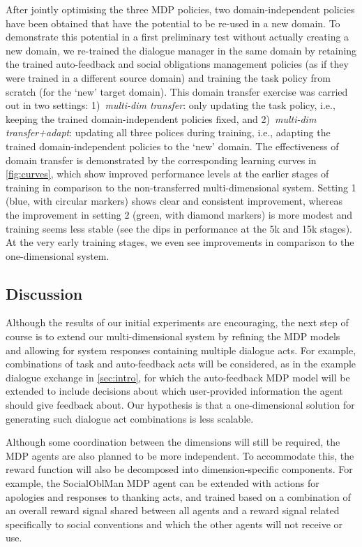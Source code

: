 \documentclass[11pt]{article}
\begin{document}
After jointly optimising the three MDP policies, two domain-independent policies have been obtained that have the potential to be re-used in a new domain.  To demonstrate this potential in a first preliminary test without actually creating a new domain, we re-trained the dialogue manager in the same domain by retaining the trained auto-feedback and social obligations management policies (as if they were trained in a different source domain) and training the task policy from scratch (for the `new' target domain).  This domain transfer exercise was carried out in two settings: 1)~\textsl{multi-dim transfer}: only updating the task policy, i.e., keeping the trained domain-independent policies fixed, and 2)~\textsl{multi-dim transfer+adapt}: updating all three polices during training, i.e., adapting the trained domain-independent policies to the `new' domain.  The effectiveness of domain transfer is demonstrated by the corresponding learning curves in \cref{fig:curves}, which show improved performance levels at the earlier stages of training in comparison to the non-transferred multi-dimensional system.  Setting 1 (blue, with circular markers) shows clear and consistent improvement, whereas the improvement in setting 2 (green, with diamond markers) is more modest and training seems less stable (see the dips in performance at the 5k and 15k stages).  At the very early training stages, we even see improvements in comparison to the one-dimensional system.

\subsection{Discussion}\label{sec:disc}

Although the results of our initial experiments are encouraging, the next step of course is to extend our multi-dimensional system by refining the MDP models and allowing for system responses containing multiple dialogue acts.  For example, combinations of task and auto-feedback acts will be considered, as in the example dialogue exchange in \cref{sec:intro}, for which the auto-feedback MDP model will be extended to include decisions about which user-provided information the agent should give feedback about.  Our hypothesis is that a one-dimensional solution for generating such dialogue act combinations is less scalable.

Although some coordination between the dimensions will still be required, the MDP agents are also planned to be more independent.  To accommodate this, the reward function will also be decomposed into dimension-specific components.  For example, the SocialOblMan MDP agent can be extended with actions for apologies and responses to thanking acts, and trained based on a combination of an overall reward signal shared between all agents and a reward signal related specifically to social conventions and which the other agents will not receive or use.
\end{document}
